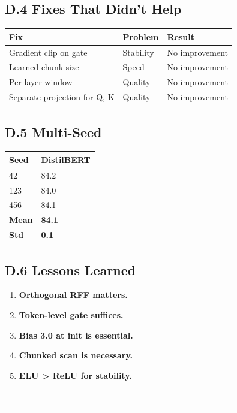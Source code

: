 \subsection{D.4 Fixes That Didn't Help}

\begin{table}[H]
\centering
\small
\begin{tabular}{lll}
\toprule
\textbf{Fix} & \textbf{Problem} & \textbf{Result} \\
\midrule
Gradient clip on gate & Stability & No improvement \\
Learned chunk size & Speed & No improvement \\
Per-layer window & Quality & No improvement \\
Separate projection for Q, K & Quality & No improvement \\
\bottomrule
\end{tabular}
\end{table}

\subsection{D.5 Multi-Seed}

\begin{table}[H]
\centering
\small
\begin{tabular}{ll}
\toprule
\textbf{Seed} & \textbf{DistilBERT} \\
\midrule
42 & 84.2 \\
123 & 84.0 \\
456 & 84.1 \\
\textbf{Mean} & \textbf{84.1} \\
\textbf{Std} & \textbf{0.1} \\
\bottomrule
\end{tabular}
\end{table}

\subsection{D.6 Lessons Learned}

\begin{enumerate}
\item \textbf{Orthogonal RFF matters.}
\item \textbf{Token-level gate suffices.}
\item \textbf{Bias 3.0 at init is essential.}
\item \textbf{Chunked scan is necessary.}
\item \textbf{ELU \textgreater{} ReLU for stability.}
\end{enumerate}
\begin{lstlisting}

---
\end{lstlisting}